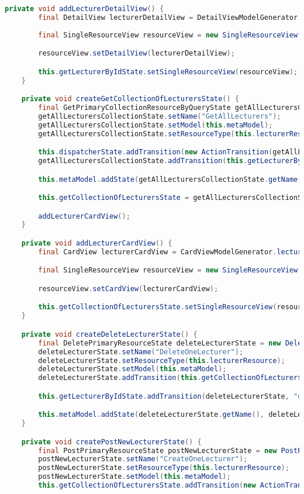 \begin{lstlisting}[label=lst:enfield_model,
language=java,
firstnumber=1,
caption=Beschreibung des \textit{Enfield-Modell} der Referenzimplementierung. ]
	private void addLecturerDetailView() {
		final DetailView lecturerDetailView = DetailViewModelGenerator.lecturer();
	
		final SingleResourceView resourceView = new SingleResourceView();

		resourceView.setDetailView(lecturerDetailView);

		this.getLecturerByIdState.setSingleResourceView(resourceView);
	}

	private void createGetCollectionOfLecturersState() {
		final GetPrimaryCollectionResourceByQueryState getAllLecturersCollectionState = new GetPrimaryCollectionResourceByQueryState();
		getAllLecturersCollectionState.setName("GetAllLecturers");
		getAllLecturersCollectionState.setModel(this.metaModel);
		getAllLecturersCollectionState.setResourceType(this.lecturerResource);

		this.dispatcherState.addTransition(new ActionTransition(getAllLecturersCollectionState, "getAllLecturers"));
		getAllLecturersCollectionState.addTransition(this.getLecturerByIdState);

		this.metaModel.addState(getAllLecturersCollectionState.getName(), getAllLecturersCollectionState);

		this.getCollectionOfLecturersState = getAllLecturersCollectionState;

		addLecturerCardView();
	}

	private void addLecturerCardView() {
		final CardView lecturerCardView = CardViewModelGenerator.lecturer();

		final SingleResourceView resourceView = new SingleResourceView();

		resourceView.setCardView(lecturerCardView);

		this.getCollectionOfLecturersState.setSingleResourceView(resourceView);
	}

	private void createDeleteLecturerState() {
		final DeletePrimaryResourceState deleteLecturerState = new DeletePrimaryResourceState();
		deleteLecturerState.setName("DeleteOneLecturer");
		deleteLecturerState.setResourceType(this.lecturerResource);
		deleteLecturerState.setModel(this.metaModel);
		deleteLecturerState.addTransition(this.getCollectionOfLecturersState, "getAllLecturers");

		this.getLecturerByIdState.addTransition(deleteLecturerState, "deleteLecturer");

		this.metaModel.addState(deleteLecturerState.getName(), deleteLecturerState);
	}

	private void createPostNewLecturerState() {
		final PostPrimaryResourceState postNewLecturerState = new PostPrimaryResourceState();
		postNewLecturerState.setName("CreateOneLecturer");
		postNewLecturerState.setResourceType(this.lecturerResource);
		postNewLecturerState.setModel(this.metaModel);
		this.getCollectionOfLecturersState.addTransition(new ActionTransition(postNewLecturerState, "createNewLecturer"));


\end{lstlisting}
